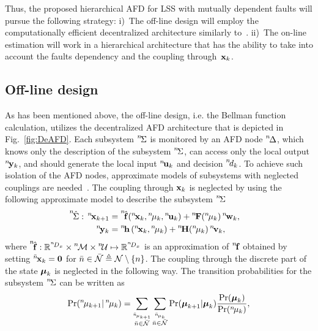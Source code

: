 \documentclass[conference,letterpaper]{IEEEtran}
\def\nth{\prescript{n\!}{}}
\def\bnth{\prescript{\bar{n}\!}{}}
\begin{document}
Thus, the proposed hierarchical AFD for LSS with mutually dependent faults will pursue the following strategy:
i)~The off-line design will employ the computationally efficient decentralized architecture similarly to~\cite{Puncochar2019:cp:ACC,Straka2019:cp:FUSION}.
ii)~The on-line estimation will work in a hierarchical architecture that has the ability to take into account the faults dependency and the coupling through~$\mathbf{x}_k$.
\subsection{Off-line design}\label{sec:off_line_design}
As has been mentioned above, the off-line design, i.e. the Bellman function calculation, utilizes the decentralized AFD architecture that is depicted in Fig.~\ref{fig:DeAFD}. 
Each subsystem $\nth{\Sigma}$ is monitored by an AFD node $\nth{\Delta}$, which knows only the description of the subsystem $\nth{\Sigma}$, can access only the local output $\nth{\bfy}_k$, and should generate the local input $\nth{\bfu}_{k}$ and decision $\nth{d}_{k}$. 
To achieve such isolation of the AFD nodes, approximate models of subsystems with neglected couplings are needed~\cite{Puncochar2019:cp:ACC}. 
The coupling through $\mathbf{x}_{k}$ is neglected by using the following approximate model to describe the subsystem $\nth{\Sigma}$
\begin{subequations}\label{ali:subsystemapprox}
	\begin{align}
		\label{ali:dynamicsapprox}
		\hspace{-1em}\nth{\hat{\Sigma}}:\,
		\nth{\bfx}_{k+1}&=\nth{\hat{\bff}}(\nth{\bfx}_{k},\nth{\mu}_{k},\nth{\bfu}_{k})+\nth{\bfF}(\nth{\mu}_k)\nth{\bfw}_k,\\
		\nth{\bfy}_{k} &= \nth{\bfh} \left(\nth{\bfx}_{k},\nth{\mu}_{k}\right) +
		\nth{\bfH}(\nth{\mu}_k)\nth{\bfv}_k,
	\end{align}
\end{subequations}
where $\nth{\hat{\bff}}:\bbR^{\nth{D}_{x}}\times\nth{\mcM}\times\nth{\mcU}\mapsto\bbR^{\nth{D}_{x}}$ is an approximation of $\nth{\bff}$ obtained by setting $\bnth{\bfx}_{k}=\bfZero$ for $\bar{n}\in\bar{\mathcal{N}}\triangleq\mathcal{N}\setminus\{n\}$. 
The coupling through the discrete part of the state $\boldsymbol{\mu}_{k}$ is neglected in the following way. 
The transition probabilities for the subsystem $\nth{\Sigma}$ can be written as
\begin{align}\label{ali:transitionapprox}
	\Pr(\nth{\mu}_{k+1}|\nth{\mu}_k)=\sum_{\stackrel{\bnth{\mu}_{k+1}}{\bar{n}\in\bar{\mcN}}}\sum_{\stackrel{\bnth{\mu}_k}{\bar{n}\in\bar{\mcN}}}\Pr(\bfmu_{k+1}|\bfmu_k)\frac{\Pr(\bfmu_k)}{\Pr(\nth{\mu}_k)},
\end{align}
\end{document}
